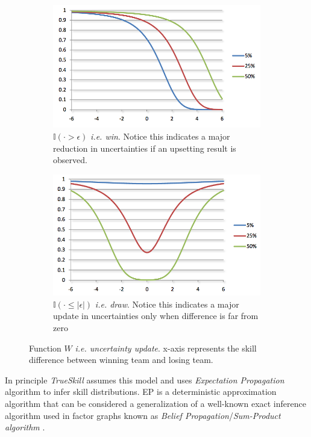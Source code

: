 \documentclass[12pt]{article}
\begin{document}
\begin{figure}[!ht]
	\begin{subfigure}{.45\columnwidth}
		\centering
		\includegraphics[width=1\columnwidth]{21}
		\caption{$\mathbb{I}( \cdot > \epsilon)$ \textit{i.e. win}. Notice this indicates a major reduction in uncertainties if an upsetting result is observed.}
	\end{subfigure}%
	\hfill
	\begin{subfigure}{.45\columnwidth}
		\centering
		\includegraphics[width=1\columnwidth]{22}
		\caption{$\mathbb{I}( \cdot \leq |\epsilon|)$ \textit{i.e. draw}. Notice this indicates a major update in uncertainties only when difference is far from zero}
	\end{subfigure}	
	\caption{Function $W$ \textit{i.e. uncertainty update}. x-axis represents the skill difference between winning team and losing team.}
	\label{comp_fact_2}
\end{figure}

In principle \textit{TrueSkill} assumes this model and uses \textit{Expectation Propagation} algorithm to infer skill distributions. EP is a deterministic approximation algorithm that can be considered a generalization of a well-known exact inference algorithm used in factor graphs known as \textit{Belief Propagation}/\textit{Sum-Product algorithm} \cite{loeliger2001factor}.
\end{document}
